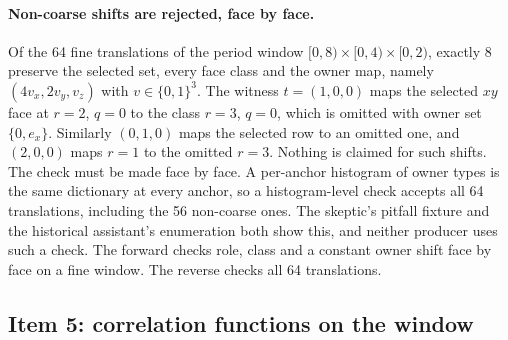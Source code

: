 \paragraph{Non-coarse shifts are rejected, face by face.} Of the 64 fine
translations of the period window $[0,8)\times[0,4)\times[0,2)$, exactly 8
preserve the selected set, every face class and the owner map, namely
$(4v_x,2v_y,v_z)$ with $v\in\{0,1\}^3$. The witness $t=(1,0,0)$ maps the
selected $xy$ face at $r=2$, $q=0$ to the class $r=3$, $q=0$, which is omitted
with owner set $\{0,e_x\}$. Similarly $(0,1,0)$ maps the selected row to an
omitted one, and $(2,0,0)$ maps $r=1$ to the omitted $r=3$. Nothing is claimed
for such shifts. The check must be made face by face. A per-anchor histogram
of owner types is the same dictionary at every anchor, so a histogram-level
check accepts all 64 translations, including the 56 non-coarse ones. The
skeptic's pitfall fixture and the historical assistant's enumeration both
show this, and neither producer uses such a check. The forward checks role,
class and a constant owner shift face by face on a fine window. The reverse
checks all 64 translations.

\subsection{Item 5: correlation functions on the window}
\label{sec:bb2-item5}

